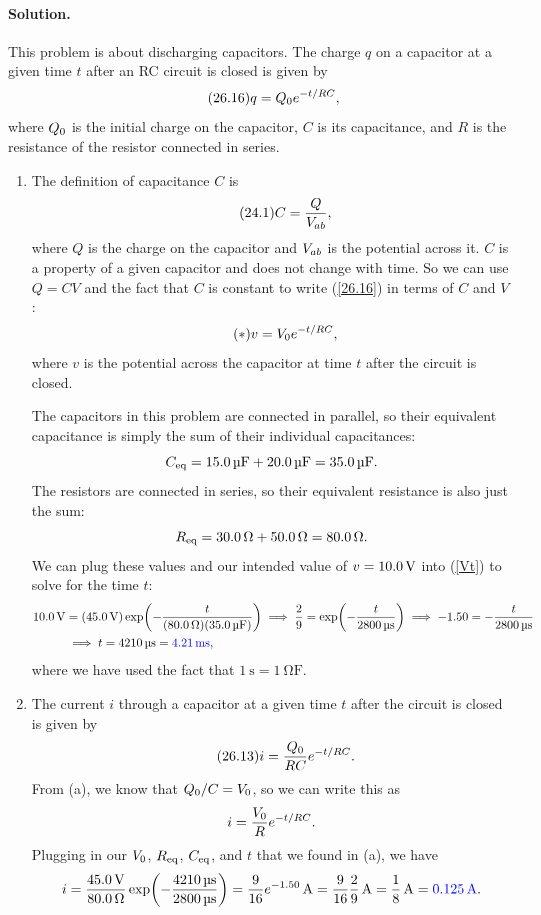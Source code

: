 \documentclass[11pt]{article}
\newcommand{\refeq}[1]{(\ref{#1})}
\newcommand{\beq}{\begin{equation*}}
\newcommand{\eeq}{\end{equation*}}
\newcommand{\beqn}{\begin{equation}}
\newcommand{\eeqn}{\end{equation}}
\newenvironment{solution}
{
    \paragraph{Solution.}
    \ignorespaces
}
{
    \bigskip
}
\begin{document}
\begin{solution}
	This problem is about discharging capacitors.  The charge $q$ on a capacitor at a given time $t$ after an RC circuit is closed is given by
	\beqn \label{26.16} \tag{26.16}
		q = \Qo e^{-t / RC},
	\eeqn
	where $Q_0$ is the initial charge on the capacitor, $C$ is its capacitance, and $R$ is the resistance of the resistor connected in series.
	
	\begin{enumerate}
		\item The definition of capacitance $C$ is
		\beqn \tag{24.1}
			C = \frac{Q}{\Vab},
		\eeqn
		where $Q$ is the charge on the capacitor and $V_{ab}$ is the potential across it.  $C$ is a property of a given capacitor and does not change with time.  So we can use $Q = C V$ and the fact that $C$ is constant to write \refeq{26.16} in terms of $C$ and $V$:
		\beqn \tag{$*$} \label{Vt}
			v = \Vo e^{-t / RC},
		\eeqn
		where $v$ is the potential across the capacitor at time $t$ after the circuit is closed.
		
		The capacitors in this problem are connected in parallel, so their equivalent capacitance is simply the sum of their individual capacitances:
		\beq
			\Ceq = \SI{15.0}{\micro\farad} + \SI{20.0}{\micro\farad}
			= \SI{35.0}{\micro\farad}.
		\eeq
		The resistors are connected in series, so their equivalent resistance is also just the sum:
		\beq
			\Req = \SI{30.0}{\ohm} + \SI{50.0}{\ohm}
			= \SI{80.0}{\ohm}.
		\eeq
		We can plug these values and our intended value of $v = \SI{10.0}{\volt}$ into \refeq{Vt} to solve for the time $t$:
		\begin{align*}
			\SI{10.0}{\volt} &= (\SI{45.0}{\volt}) \exp(-\frac{t}{(\SI{80.0}{\ohm}) (\SI{35.0}{\micro\farad})})
			\implies
			\frac{2}{9} = \exp(-\frac{t}{\SI{2800}{\micro\second}})
			\implies
			-1.50 = -\frac{t}{\SI{2800}{\micro\second}} \\
			&\implies
			t = \SI{4210}{\micro\second}
			= {\color{blue} \SI{4.21}{\milli\second}},
		\end{align*}
		where we have used the fact that $\SI{1}{\second} = \SI{1}{\ohm\farad}$.
		
		\item The current $i$ through a capacitor at a given time $t$ after the circuit is closed is given by
		\beq \tag{26.13}
			i = \frac{\Qo}{RC} e^{-t / RC}.
		\eeq
		From (a), we know that $Q_0 / C = V_0$, so we can write this as
		\beq
			i = \frac{\Vo}{R} e^{-t / RC}.
		\eeq
		Plugging in our $V_0$, $R_\text{eq}$, $C_\text{eq}$, and $t$ that we found in (a), we have
		\beq
			i = \frac{\Svolt{45.0}}{\SI{80.0}{\ohm}} \exp(-\frac{\SI{4210}{\micro\second}}{\SI{2800}{\micro\second}})
			= \frac{9}{16} e^{-1.50}\,\si{\ampere}
			= \frac{9}{16} \frac{2}{9}\,\si{\ampere}
			= \frac{1}{8}\,\si{\ampere}
			= {\color{blue} \SI{0.125}{\ampere}}.
		\eeq
	\end{enumerate}
\end{solution}
\end{document}
